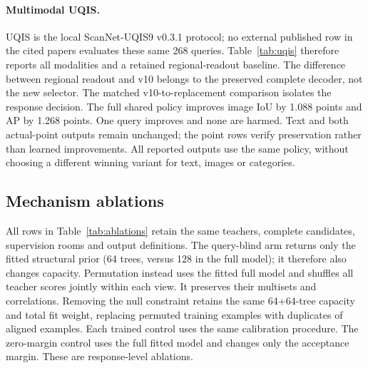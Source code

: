 \paragraph{Multimodal UQIS.}
UQIS is the local ScanNet-UQIS9 v0.3.1 protocol; no external published row in
the cited papers evaluates these same 268 queries. Table~\ref{tab:uqis} therefore
reports all modalities and a retained regional-readout baseline. The difference
between regional readout and v10 belongs to the preserved complete decoder,
not the new selector. The matched v10-to-replacement comparison isolates the
response decision. The full
shared policy improves image IoU by 1.088 points and AP by 1.268 points. One
query improves and none are harmed. Text and both actual-point outputs remain
unchanged; the point rows verify preservation rather than learned improvements.
All reported outputs use the same policy, without choosing a different winning
variant for text, images or categories.
\begin{table}[ht]
\centering\small\resizebox{\linewidth}{!}{}
\caption{UQIS matched comparison. T/I/P2/P3 denote text, image, 2D point and 3D
point. Actual selected-set IoU and continuous-response AP are distinct metrics.}
\label{tab:uqis}
\end{table}

\subsection{Mechanism ablations}
All rows in Table~\ref{tab:ablations} retain the same teachers, complete
candidates, supervision rooms and output definitions. The query-blind arm returns only the fitted structural prior (64 trees,
versus 128 in the full model); it therefore also changes capacity. Permutation
instead uses the fitted full model and
shuffles all teacher scores jointly within each view. It preserves their
multisets and correlations. Removing the null constraint retains the same
64+64-tree capacity and total fit weight, replacing permuted training examples
with duplicates of aligned examples. Each trained control uses the same
calibration procedure. The zero-margin control uses the full fitted model and
changes only the acceptance margin. These are response-level ablations.

\begin{table}[ht]
\centering\small\resizebox{\linewidth}{!}{}
\caption{Matched controls on all ten ScanNet rooms and 268 UQIS queries.
S19/15/10 are mesh mIoU. Repair/harm counts concern actual UQIS set IoU;
unchanged actual points are included in the denominator. This is one coupled
policy comparison, not a collection of per-benchmark best runs.}
\label{tab:ablations}
\end{table}

